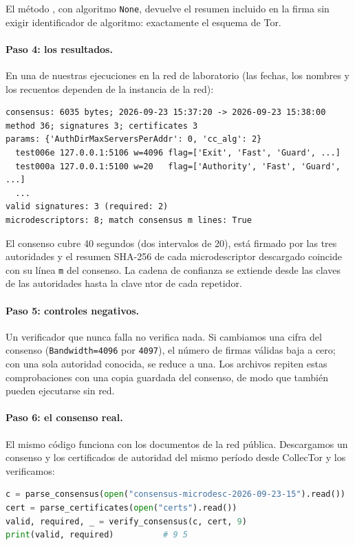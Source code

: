 El método , con algoritmo \texttt{None}, devuelve el resumen incluido en la firma sin exigir identificador de algoritmo: exactamente el esquema de Tor.

\paragraph{Paso 4: los resultados.} En una de nuestras ejecuciones en la red de laboratorio (las fechas, los nombres y los recuentos dependen de la instancia de la red):
\begin{lstlisting}[numbers=none]
consensus: 6035 bytes; 2026-09-23 15:37:20 -> 2026-09-23 15:38:00
method 36; signatures 3; certificates 3
params: {'AuthDirMaxServersPerAddr': 0, 'cc_alg': 2}
  test006e 127.0.0.1:5106 w=4096 flag=['Exit', 'Fast', 'Guard', ...]
  test000a 127.0.0.1:5100 w=20   flag=['Authority', 'Fast', 'Guard', ...]
  ...
valid signatures: 3 (required: 2)
microdescriptors: 8; match consensus m lines: True
\end{lstlisting}

El consenso cubre 40 segundos (dos intervalos de 20), está firmado por las tres autoridades y el resumen SHA-256 de cada microdescriptor descargado coincide con su línea \texttt{m} del consenso. La cadena de confianza se extiende desde las claves de las autoridades hasta la clave ntor de cada repetidor.

\paragraph{Paso 5: controles negativos.} Un verificador que nunca falla no verifica nada. Si cambiamos una cifra del consenso (\texttt{Bandwidth=4096} por \texttt{4097}), el número de firmas válidas baja a cero; con una sola autoridad conocida, se reduce a una. Los archivos  repiten estas comprobaciones con una copia guardada del consenso, de modo que también pueden ejecutarse sin red.

\paragraph{Paso 6: el consenso real.} El mismo código funciona con los documentos de la red pública. Descargamos un consenso y los certificados de autoridad del mismo período desde CollecTor y los verificamos:

\begin{lstlisting}[language=Python,numbers=none]
c = parse_consensus(open("consensus-microdesc-2026-09-23-15").read())
cert = parse_certificates(open("certs").read())
valid, required, _ = verify_consensus(c, cert, 9)
print(valid, required)          # 9 5
\end{lstlisting}

